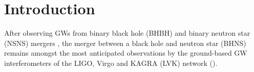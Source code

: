 \documentclass[twocolumn]{aastex63}
\newcommand{\floor}[1]{\textbf{\textcolor{magenta}{[Floor: #1]}}}
\newcommand{\todo}[1]{\textcolor{red}{[To do: #1]}}
\newcommand\bhnsSingle{BHNS\xspace}
\begin{document}



\section{Introduction}
\label{sec:introduction}
%
After observing \acp{GW} from  binary black hole (BHBH) and  binary neutron star  (NSNS) mergers   \citep{2019PhRvX...9c1040A,2019arXiv191009528Z,2019PhRvD.100b3007Z, 2019arXiv190407214V, 2019arXiv191005331N, 2020arXiv200101761T, 2020arXiv200408342T}, the merger between a black hole and neutron star (BHNS) %
 remains amongst the most anticipated   observations by the ground-based \ac{GW} interferometers of the LIGO, Virgo and KAGRA (LVK) network (\citealt{2010JPhCS.228a2012L, 2015CQGra..32g4001L, 2016CQGra..33g5009D,2015CQGra..32b4001A,2012CQGra..29l4007S, 2013PhRvD..88d3007A}). 


\end{document}
